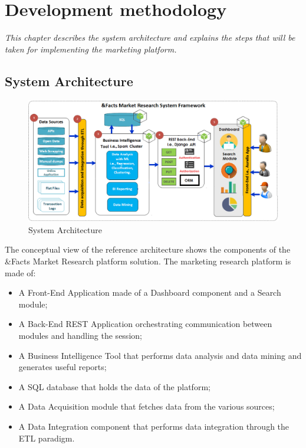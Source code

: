 \newpage
\chapter{Development methodology}

\textsl{This chapter describes the system architecture and explains the steps that will be taken for implementing the marketing platform.}

\section{System Architecture}

\begin{figure}[H]
	\centering
	\includegraphics[scale=0.55]{img/systemarchitecture.png}
	\caption{System Architecture}
\end{figure} 

The conceptual view of the reference architecture shows the components of the \&Facts Market Research platform solution. The marketing research platform is made of:
\begin{itemize} 
	\item A Front-End Application made of a Dashboard component and a Search module;
	\item A Back-End REST Application orchestrating communication between modules and handling the session;
	\item A Business Intelligence Tool that performs data analysis and data mining and generates useful reports;
	\item A SQL database that holds the data of the platform;
	\item A Data Acquisition module that fetches data from the various sources;
	\item A Data Integration component that performs data integration through the ETL paradigm.
\end{itemize} 


